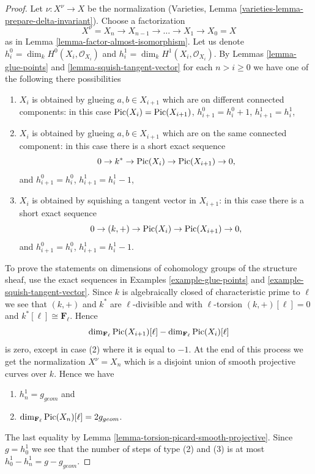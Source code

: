 \begin{proof}
Let $\nu : X^\nu \to X$ be the normalization
(Varieties, Lemma \ref{varieties-lemma-prepare-delta-invariant}).
Choose a factorization
$$
X^\nu = X_n \to X_{n - 1} \to \ldots \to X_1 \to X_0 = X
$$
as in Lemma \ref{lemma-factor-almost-isomorphism}.
Let us denote $h^0_i = \dim_k H^0(X_i, \mathcal{O}_{X_i})$
and $h^1_i = \dim_k H^1(X_i, \mathcal{O}_{X_i})$.
By Lemmas \ref{lemma-glue-points} and \ref{lemma-squish-tangent-vector}
for each $n > i \geq 0$ we have
one of the following there possibilities
\begin{enumerate}
\item $X_i$ is obtained by glueing $a, b \in X_{i + 1}$
which are on different connected components: in this case
$\mathop{\mathrm{Pic}}\nolimits(X_i) = \mathop{\mathrm{Pic}}\nolimits(X_{i + 1})$,
$h^0_{i + 1} = h^0_i + 1$, $h^1_{i + 1} = h^1_i$,
\item $X_i$ is obtained by glueing $a, b \in X_{i + 1}$
which are on the same connected component: in this case
there is a short exact sequence
$$
0 \to k^* \to \mathop{\mathrm{Pic}}\nolimits(X_i) \to \mathop{\mathrm{Pic}}\nolimits(X_{i + 1}) \to 0,
$$
and $h^0_{i + 1} = h^0_i$, $h^1_{i + 1} = h^1_i - 1$,
\item $X_i$ is obtained by squishing a tangent vector in $X_{i + 1}$:
in this case there is a short exact sequence
$$
0 \to (k, +) \to \mathop{\mathrm{Pic}}\nolimits(X_i) \to \mathop{\mathrm{Pic}}\nolimits(X_{i + 1}) \to 0,
$$
and $h^0_{i + 1} = h^0_i$, $h^1_{i + 1} = h^1_i - 1$.
\end{enumerate}
To prove the statements on dimensions of cohomology groups of the
structure sheaf, use the exact sequences in
Examples \ref{example-glue-points} and \ref{example-squish-tangent-vector}.
Since $k$ is algebraically closed of characteristic prime to $\ell$
we see that $(k, +)$ and $k^*$ are $\ell$-divisible and with
$\ell$-torsion $(k, +)[\ell] = 0$ and $k^*[\ell] \cong \mathbf{F}_\ell$.
Hence
$$
\dim_{\mathbf{F}_\ell} \mathop{\mathrm{Pic}}\nolimits(X_{i + 1})[\ell] -
\dim_{\mathbf{F}_\ell}\mathop{\mathrm{Pic}}\nolimits(X_i)[\ell]
$$
is zero, except in case (2) where it is equal to $-1$.
At the end of this process we get the normalization
$X^\nu = X_n$ which is a disjoint union of smooth projective
curves over $k$. Hence we have
\begin{enumerate}
\item $h^1_n = g_{geom}$ and
\item $\dim_{\mathbf{F}_\ell} \mathop{\mathrm{Pic}}\nolimits(X_n)[\ell] = 2g_{geom}$.
\end{enumerate}
The last equality by Lemma \ref{lemma-torsion-picard-smooth-projective}.
Since $g = h^1_0$ we see that the number of steps of type
(2) and (3) is at most $h^1_0 - h^1_n = g - g_{geom}$.

\end{proof}
